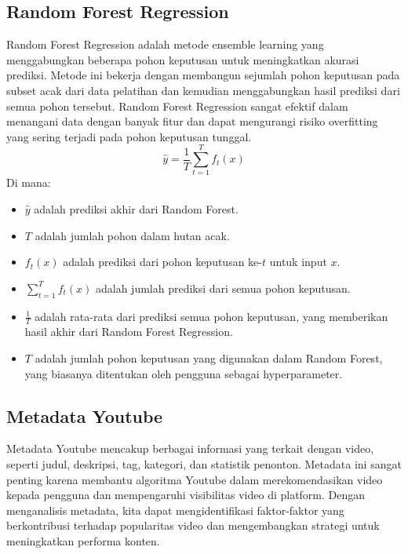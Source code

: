 \subsection{Random Forest Regression}
Random Forest Regression adalah metode ensemble learning yang menggabungkan beberapa pohon keputusan untuk meningkatkan akurasi prediksi. Metode ini bekerja dengan membangun sejumlah pohon keputusan pada subset acak dari data pelatihan dan kemudian menggabungkan hasil prediksi dari semua pohon tersebut. Random Forest Regression sangat efektif dalam menangani data dengan banyak fitur dan dapat mengurangi risiko overfitting yang sering terjadi pada pohon keputusan tunggal.
\begin{equation}
    \hat{y} = \frac{1}{T} \sum_{t=1}^{T} f_t(x)
\end{equation}
Di mana:
\begin{itemize}
    \item $\hat{y}$ adalah prediksi akhir dari Random Forest.
    \item $T$ adalah jumlah pohon dalam hutan acak.
    \item $f_t(x)$ adalah prediksi dari pohon keputusan ke-$t$ untuk input $x$.
    \item $\sum_{t=1}^{T} f_t(x)$ adalah jumlah prediksi dari semua pohon keputusan.
    \item $\frac{1}{T}$ adalah rata-rata dari prediksi semua pohon keputusan, yang memberikan hasil akhir dari Random Forest Regression.
    \item $T$ adalah jumlah pohon keputusan yang digunakan dalam Random Forest, yang biasanya ditentukan oleh pengguna sebagai hyperparameter.
\end{itemize}


\subsection{Metadata Youtube}
Metadata Youtube mencakup berbagai informasi yang terkait dengan video, seperti judul, deskripsi, tag, kategori, dan statistik penonton. Metadata ini sangat penting karena membantu algoritma Youtube dalam merekomendasikan video kepada pengguna dan mempengaruhi visibilitas video di platform. Dengan menganalisis metadata, kita dapat mengidentifikasi faktor-faktor yang berkontribusi terhadap popularitas video dan mengembangkan strategi untuk meningkatkan performa konten.

